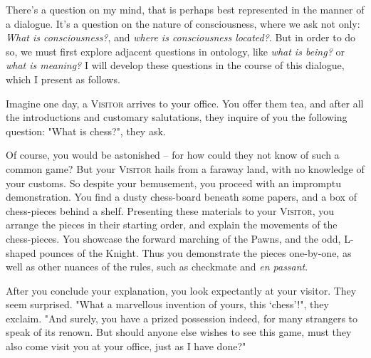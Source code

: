 
\noindent
There's a question on my mind, that is perhaps best represented in the manner of a dialogue. It's a question on the nature of consciousness, where we ask not only: \emph{What is consciousness?}, and \emph{where is consciousness located?}. But in order to do so, we must first explore adjacent questions in ontology, like \emph{what is being?} or \emph{what is meaning?} I will develop these questions in the course of this dialogue, which I present as follows.


Imagine one day, a \textsc{Visitor} arrives to your office. You offer them tea, and after all the introductions and customary salutations, they inquire of you the following question: "What is chess?", they ask.

Of course, you would be astonished -- for how could they not know of such a common game? But your \textsc{Visitor} hails from a faraway land, with no knowledge of your customs. So despite your bemusement, you proceed with an impromptu demonstration. You find a dusty chess-board beneath some papers, and a box of chess-pieces behind a shelf. Presenting these materials to your \textsc{Visitor}, you arrange the pieces in their starting order, and explain the movements of the chess-pieces. You showcase the forward marching of the Pawns, and the odd, L-shaped pounces of the Knight. Thus you demonstrate the pieces one-by-one, as well as other nuances of the rules, such as checkmate and \emph{en passant}.

After you conclude your explanation, you look expectantly at your visitor. They seem surprised. "What a marvellous invention of yours, this `chess'!", they exclaim. "And surely, you have a prized possession indeed, for many strangers to speak of its renown. But should anyone else wishes to see this game, must they also come visit you at your office, just as I have done?"

